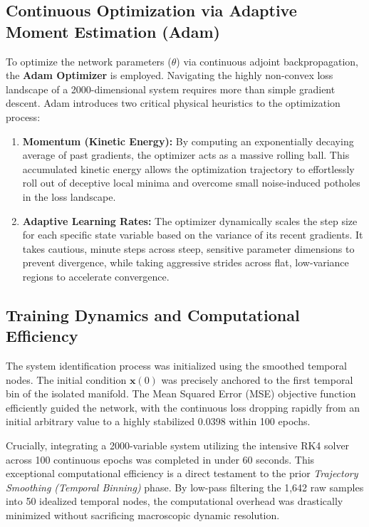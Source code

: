 \documentclass[12pt, a4paper]{article}
\begin{document}
	\subsection{Continuous Optimization via Adaptive Moment Estimation (Adam)}
	To optimize the network parameters ($\theta$) via continuous adjoint backpropagation, the \textbf{Adam Optimizer} is employed. Navigating the highly non-convex loss landscape of a 2000-dimensional system requires more than simple gradient descent. Adam introduces two critical physical heuristics to the optimization process:
	\begin{enumerate}
		\item \textbf{Momentum (Kinetic Energy):} By computing an exponentially decaying average of past gradients, the optimizer acts as a massive rolling ball. This accumulated kinetic energy allows the optimization trajectory to effortlessly roll out of deceptive local minima and overcome small noise-induced potholes in the loss landscape.
		\item \textbf{Adaptive Learning Rates:} The optimizer dynamically scales the step size for each specific state variable based on the variance of its recent gradients. It takes cautious, minute steps across steep, sensitive parameter dimensions to prevent divergence, while taking aggressive strides across flat, low-variance regions to accelerate convergence.
	\end{enumerate}
	
	\subsection{Training Dynamics and Computational Efficiency}
	The system identification process was initialized using the smoothed temporal nodes. The initial condition $\mathbf{x}(0)$ was precisely anchored to the first temporal bin of the isolated manifold. The Mean Squared Error (MSE) objective function efficiently guided the network, with the continuous loss dropping rapidly from an initial arbitrary value to a highly stabilized 0.0398 within 100 epochs. 
	
	Crucially, integrating a 2000-variable system utilizing the intensive RK4 solver across 100 continuous epochs was completed in under 60 seconds. This exceptional computational efficiency is a direct testament to the prior \textit{Trajectory Smoothing (Temporal Binning)} phase. By low-pass filtering the 1,642 raw samples into 50 idealized temporal nodes, the computational overhead was drastically minimized without sacrificing macroscopic dynamic resolution.
	
\end{document}
